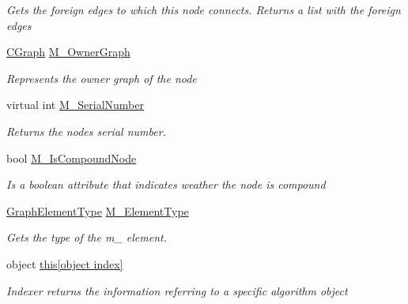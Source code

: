 \begin{DoxyCompactItemize}
\begin{DoxyCompactList}\small\item\em Gets the foreign edges to which this node connects. Returns a list with the foreign edges \end{DoxyCompactList}\item 
\hyperlink{class_graph_library_1_1_c_graph}{C\+Graph} \hyperlink{class_graph_library_1_1_c_graph_node_af74860380cdc7a69e9ec6634e2ccdc48}{M\+\_\+\+Owner\+Graph}
\begin{DoxyCompactList}\small\item\em Represents the owner graph of the node \end{DoxyCompactList}\item 
virtual int \hyperlink{class_graph_library_1_1_c_graph_node_a43e9c4162fb28defd6c0193f2222d199}{M\+\_\+\+Serial\+Number}
\begin{DoxyCompactList}\small\item\em Returns the node\textquotesingle{}s serial number. \end{DoxyCompactList}\item 
bool \hyperlink{class_graph_library_1_1_c_graph_node_a8b1a7e4ee0887d7555ed8e7fc183cf21}{M\+\_\+\+Is\+Compound\+Node}
\begin{DoxyCompactList}\small\item\em Is a boolean attribute that indicates weather the node is compound \end{DoxyCompactList}\item 
\hyperlink{namespace_graph_library_1_1_generics_a919a165f16deccdd1b3d7e8a93423fbc}{Graph\+Element\+Type} \hyperlink{class_graph_library_1_1_c_graph_node_a1b13fbb13f63117f18610da1fe6b86ac}{M\+\_\+\+Element\+Type}
\begin{DoxyCompactList}\small\item\em Gets the type of the m\+\_\+ element. \end{DoxyCompactList}\item 
object \hyperlink{class_graph_library_1_1_c_graph_node_a2e5ed7afca428365f7aef68611f852fe}{this\mbox{[}object index\mbox{]}}
\begin{DoxyCompactList}\small\item\em Indexer returns the information referring to a specific algorithm object \end{DoxyCompactList}\end{DoxyCompactItemize}


